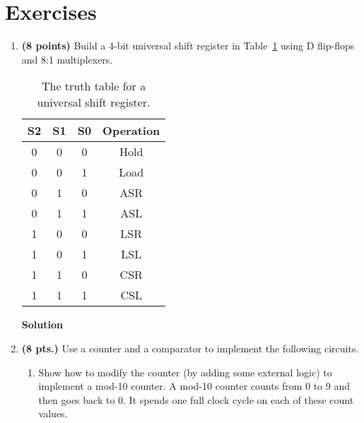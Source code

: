 \section{Exercises}
\label{section:sequentialBB}
\graphicspath{ {./chapter06/FigHw} }

\begin{enumerate}
    \item \textbf{ (8 points)} Build a 4-bit universal shift register in
        Table~\ref{table:uni} using D flip-flops and 8:1 multiplexers.

        \begin{table}
            \begin{tabular}{c|c|c||c}
                S2 & S1 & S0 & Operation \\ \hline
                0  &  0 &  0 & Hold \\ \hline
                0  &  0 &  1 & Load \\ \hline
                0  &  1 &  0 & ASR  \\ \hline
                0  &  1 &  1 & ASL  \\ \hline
                1  &  0 &  0 & LSR  \\ \hline
                1  &  0 &  1 & LSL  \\ \hline
                1  &  1 &  0 & CSR  \\ \hline
                1  &  1 &  1 & CSL  \\
            \end{tabular}
            \caption{The truth table for a universal shift register.}
            \label{table:uni}
        \end{table}

        \begin{onlysolution}  \textbf{Solution} \itshape{
                \begin{figure}[ht]
                \end{figure}
            }
        \end{onlysolution}

    \item \textbf{ (8 pts.)} Use a counter and a comparator
        to implement the following circuits.

        \begin{enumerate}
            \item Show how to modify the counter (by adding some external logic)
                to implement a mod-10 counter.  A mod-10 counter counts from 0 to
                9 and then goes back to 0.  It spends one full clock cycle on each
                of these count values.


\end{enumerate}
\end{enumerate}
